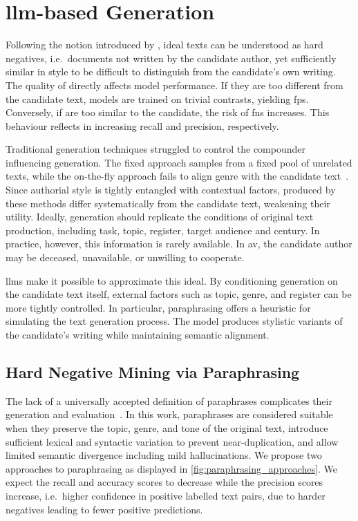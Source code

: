 \section{\acs{llm}-based \Imp{} Generation}
\label{sec:impostor_generation}

Following the notion introduced by \citet{koppel_determining_2014}, ideal \imp{} texts can be understood as hard negatives, i.e.\ documents not written by the candidate author, yet sufficiently similar in style to be difficult to distinguish from the candidate's own writing. 
The quality of \imps{} directly affects model performance.
If they are too different from the candidate text, models are trained on trivial contrasts, yielding \acp{fp}. 
Conversely, if \imps{} are too similar to the candidate, the risk of \acp{fn} increases.
This behaviour reflects in increasing recall and precision, respectively.

Traditional \imp{} generation techniques struggled to control the compounder influencing \imp{} generation. 
The fixed approach samples from a fixed pool of unrelated texts, while the on-the-fly approach fails to align genre with the candidate text~\citep{koppel_determining_2014}. 
Since authorial style is tightly entangled with contextual factors, \imps{} produced by these methods differ systematically from the candidate text, weakening their utility. 
Ideally, \imp{} generation should replicate the conditions of original text production, including task, topic, register, target audience and century. 
In practice, however, this information is rarely available.
In \ac{av}, the candidate author may be deceased, unavailable, or unwilling to cooperate.

\acp{llm} make it possible to approximate this ideal. 
By conditioning generation on the candidate text itself, external factors such as topic, genre, and register can be more tightly controlled. 
In particular, paraphrasing offers a heuristic for simulating the text generation process. 
The model produces stylistic variants of the candidate's writing while maintaining semantic alignment.


\subsection{Hard Negative Mining via Paraphrasing}

The lack of a universally accepted definition of paraphrases complicates their generation and evaluation~\citep{gohsen_task_oriented_2024}. 
In this work, paraphrases are considered suitable \imps{} when they preserve the topic, genre, and tone of the original text, introduce sufficient lexical and syntactic variation to prevent near-duplication, and allow limited semantic divergence including mild hallucinations.
We propose two approaches to paraphrasing as displayed in \autoref{fig:paraphrasing_approaches}.
We expect the \impAppr{} recall and accuracy scores to decrease while the precision scores increase, i.e.\ higher confidence in positive labelled text pairs, due to harder negatives leading to fewer positive predictions.

